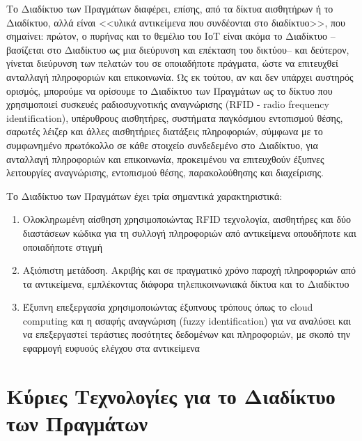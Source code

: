 \documentclass[12pt, a4paper, oneside]{report}
\begin{document}
Το Διαδίκτυο των Πραγμάτων διαφέρει, επίσης, από τα δίκτυα αισθητήρων ή το Διαδίκτυο, αλλά είναι <<υλικά αντικείμενα που συνδέονται στο διαδίκτυο>>, που σημαίνει: πρώτον, ο πυρήνας και το θεμέλιο του ΙοΤ είναι ακόμα το Διαδίκτυο –βασίζεται στο Διαδίκτυο ως μια διεύρυνση και επέκταση του δικτύου– και δεύτερον, γίνεται διεύρυνση των πελατών του σε οποιαδήποτε πράγματα, ώστε να επιτευχθεί ανταλλαγή πληροφοριών και επικοινωνία. Ως εκ τούτου, αν και δεν υπάρχει αυστηρός ορισμός, μπορούμε να ορίσουμε το Διαδίκτυο των Πραγμάτων ως το δίκτυο που χρησιμοποιεί συσκευές ραδιοσυχνοτικής αναγνώρισης (RFID - radio frequency identification), υπέρυθρους αισθητήρες, συστήματα παγκόσμιου εντοπισμού θέσης, σαρωτές λέιζερ και άλλες αισθητήριες διατάξεις πληροφοριών, σύμφωνα με το συμφωνημένο πρωτόκολλο σε κάθε στοιχείο συνδεδεμένο στο Διαδίκτυο, για ανταλλαγή πληροφοριών και επικοινωνία, προκειμένου να επιτευχθούν έξυπνες λειτουργίες αναγνώρισης, εντοπισμού θέσης, παρακολούθησης και διαχείρισης.
\medskip

Το Διαδίκτυο των Πραγμάτων έχει τρία σημαντικά χαρακτηριστικά:
\begin{enumerate}
\item Ολοκληρωμένη αίσθηση χρησιμοποιώντας RFID τεχνολογία, αισθητήρες και δύο διαστάσεων κώδικα για τη συλλογή πληροφοριών από αντικείμενα οπουδήποτε και οποιαδήποτε στιγμή
\item Αξιόπιστη μετάδοση. Ακριβής και σε πραγματικό χρόνο παροχή πληροφοριών από τα αντικείμενα, εμπλέκοντας διάφορα τηλεπικοινωνιακά δίκτυα και το Διαδίκτυο
\item Έξυπνη επεξεργασία χρησιμοποιώντας έξυπνους τρόπους όπως το cloud computing και η ασαφής αναγνώριση (fuzzy identification) για να αναλύσει και να επεξεργαστεί τεράστιες ποσότητες δεδομένων και πληροφοριών, με σκοπό την εφαρμογή ευφυούς ελέγχου στα αντικείμενα
\end{enumerate}

\section{Κύριες Τεχνολογίες για το Διαδίκτυο των Πραγμάτων}
\end{document}
